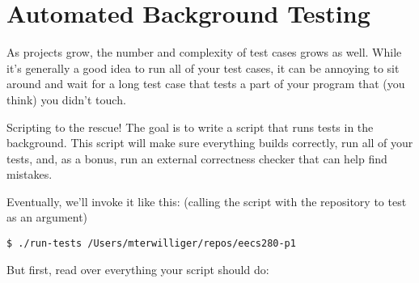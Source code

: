 \documentclass{article}
\begin{document}


\section{Automated Background Testing}

As projects grow, the number and complexity of test cases grows as well. While
it's generally a good idea to run all of your test cases, it can be annoying
to sit around and wait for a long test case that tests a part of your program
that (you think) you didn't touch.

\medskip
\noindent
Scripting to the rescue! The goal is to write a script that runs tests in the
background. This script will make sure everything builds correctly, run all of
your tests, and, as a bonus, run an external correctness checker that can help
find mistakes.

\medskip
\noindent
Eventually, we'll invoke it like this: (calling the script with the repository to test as an argument)
\begin{lstlisting}
$ ./run-tests /Users/mterwilliger/repos/eecs280-p1
\end{lstlisting}

\noindent
But first, read over everything your script should do:
\end{document}
